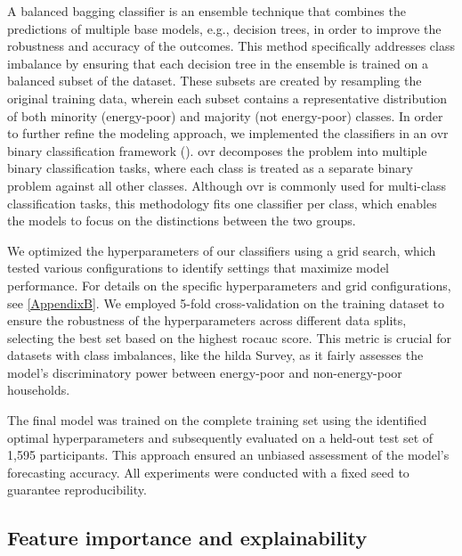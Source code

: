\documentclass[preprint,authoryear,12pt]{elsarticle}
\newcommand{\citeTwo}[1]{(\cite{#1})}
\begin{document}
A balanced bagging classifier is an ensemble technique that combines the predictions of multiple base models, e.g., decision trees, in order to improve the robustness and accuracy of the outcomes. This method specifically addresses class imbalance by ensuring that each decision tree in the ensemble is trained on a balanced subset of the dataset. These subsets are created by resampling the original training data, wherein each subset contains a representative distribution of both minority (energy-poor) and majority (not energy-poor) classes. In order to further refine the modeling approach, we implemented the classifiers in an \Gls{ovr} binary classification framework \citeTwo{Mur12}. \Gls{ovr} decomposes the problem into multiple binary classification tasks, where each class is treated as a separate binary problem against all other classes. Although \Gls{ovr} is commonly used for multi-class classification tasks, this methodology fits one classifier per class, which enables the models to focus on the distinctions between the two groups.

We optimized the hyperparameters of our classifiers using a grid search, which tested various configurations to identify settings that maximize model performance. For details on the specific hyperparameters and grid configurations, see \ref{AppendixB}. We employed 5-fold cross-validation on the training dataset to ensure the robustness of the hyperparameters across different data splits, selecting the best set based on the highest \Gls{rocauc} score. This metric is crucial for datasets with class imbalances, like the \Gls{hilda} Survey, as it fairly assesses the model's discriminatory power between energy-poor and non-energy-poor households.

The final model was trained on the complete training set using the identified optimal hyperparameters and subsequently evaluated on a held-out test set of 1,595 participants. This approach ensured an unbiased assessment of the model’s forecasting accuracy. All experiments were conducted with a fixed seed to guarantee reproducibility.

\subsection{Feature importance and explainability} \label{Feature_importance_and_explainability}
\end{document}
